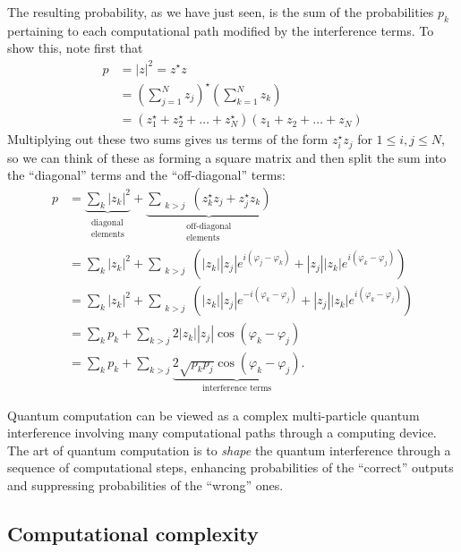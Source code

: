 \documentclass[fleqn]{article}
\newenvironment{idea}{\noindent}{\medskip}
\begin{document}
The resulting probability, as we have just seen, is the sum of the probabilities \(p_k\) pertaining to each computational path modified by the interference terms.
To show this, note first that
\[
  \begin{aligned}
    p
    &= |z|^2 = z^\star z
  \\&= \left(  \sum_{j=1}^N z_j \right)^\star
       \left(  \sum_{k=1}^N z_k \right)
  \\&= \left( z_1^\star + z_2^\star + \dots + z_N^\star \right)
       \left( z_1 + z_2 + \dots + z_N \right)
  \end{aligned}
\]
Multiplying out these two sums gives us terms of the form \(z_i^\star z_j\) for \(1\leqslant i,j\leqslant N\), so we can think of these as forming a square matrix and then split the sum into the ``diagonal'' terms and the ``off-diagonal'' terms:
\[
  \begin{aligned}
    p
    &= \underbrace{\sum_k |z_k|^2}_{\substack{\text{diagonal}\\ \text{elements}}}
  + \underbrace{\sum_{\substack{ k > j}} \left( z_k^\star z_j + z_j^\star z_k\right)}_{\substack{\text{off-diagonal}\\ \text{elements}}}
  \\&= \sum_k |z_k|^2 + \sum_{\substack{ k > j}} \left( |z_k||z_j|
          e^{i(\varphi_j-\varphi_k)}
          + |z_j||z_k|
          e^{i(\varphi_k-\varphi_j)}
        \right)
  \\&= \sum_k |z_k|^2 + \sum_{\substack{ k > j}} \left( |z_k||z_j|
        e^{-i(\varphi_k-\varphi_j)}
        + |z_j||z_k|
        e^{i(\varphi_k-\varphi_j)}
      \right)
  \\&= \sum_k p_k + \sum_{k > j} 2 |z_k||z_j|\cos(\varphi_k-\varphi_j)
  \\&= \sum_k p_k + \sum_{k > j} \underbrace{2 \sqrt{p_k p_j}\cos(\varphi_k-\varphi_j)}_{\text{interference terms}}.
  \end{aligned}
\]

\begin{idea}
Quantum computation can be viewed as a complex multi-particle quantum interference involving many computational paths through a computing device.
The art of quantum computation is to \emph{shape} the quantum interference through a sequence of computational steps, enhancing probabilities of the ``correct'' outputs and suppressing probabilities of the ``wrong'' ones.

\end{idea}

\hypertarget{computational-complexity}{%
\subsection{Computational complexity}\label{computational-complexity}}
\end{document}
